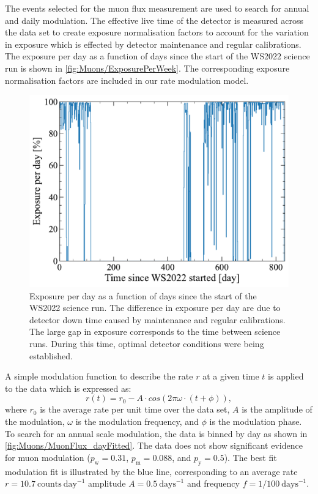 The events selected for the muon flux measurement are used to search for annual and daily modulation. The effective live time of the detector is measured across the data set to create exposure normalisation factors to account for the variation in exposure which is effected by detector maintenance and regular calibrations. The exposure per day as a function of days since the start of the WS2022 science run is shown in \autoref{fig:Muons/ExposurePerWeek}. The corresponding exposure normalisation factors are included in our rate modulation model.
\begin{figure}[h!]
    \centering
    \includegraphics[width=0.8\linewidth]{figures/Muons/ExposurePerDay.pdf}
    \caption[Exposure per day as a function of days since the start of the WS2022 science run.]{Exposure per day as a function of days since the start of the WS2022 science run. The difference in exposure per day are due to detector down time caused by maintenance and regular calibrations. The large gap in exposure corresponds to the time between science runs. During this time, optimal detector conditions were being established.}
    \label{fig:Muons/ExposurePerWeek}
\end{figure}
A simple modulation function to describe the rate $r$ at a given time $t$ is applied to the data which is expressed as:
\begin{equation}\label{eqn:Muons/modulation}
    r(t)=r_0-A\cdot cos(2\pi\omega\cdot(t+\phi)),
\end{equation}
where $r_0$ is the average rate per unit time over the data set, $A$ is the amplitude of the modulation, $\omega$ is the modulation frequency, and $\phi$ is the modulation phase. To search for an annual scale modulation, the data is binned by day as shown in \autoref{fig:Muons/MuonFlux_dayFitted}. The data does not show significant evidence for muon modulation ($p_\text{w}=0.31$, $p_\text{m}=0.088$, and $p_\text{y}=0.5$). The best fit modulation fit is illustrated by the blue line, corresponding to an average rate $r=10.7~\text{counts}~\text{day}^{-1}$ amplitude $A=0.5~\text{days}^{-1}$ and frequency $f=1/100~\text{days}^{-1}$.
